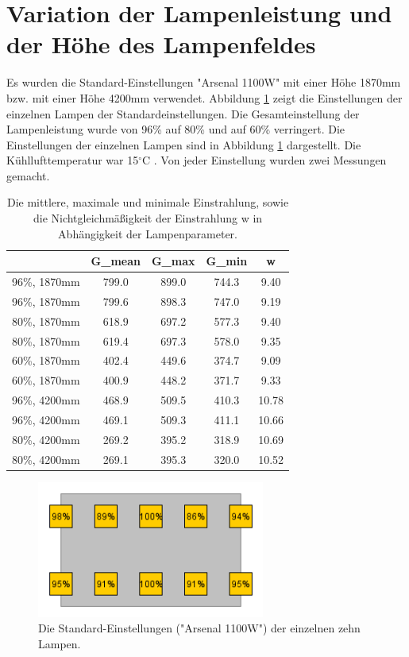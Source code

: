 \documentclass[a4paper,bibtotoc,oneside]{scrbook}
\begin{document}
\FloatBarrier

\section{Variation der Lampenleistung und der Höhe des Lampenfeldes}

Es wurden die Standard-Einstellungen "Arsenal 1100W" mit einer Höhe 1870mm bzw. mit einer Höhe 4200mm verwendet. Abbildung \ref{std} zeigt die Einstellungen der einzelnen Lampen der Standardeinstellungen. Die Gesamteinstellung der Lampenleistung wurde von 96\% auf 80\% und auf 60\% verringert. Die Einstellungen der einzelnen Lampen sind in Abbildung \ref{std} dargestellt. Die Kühllufttemperatur war 15$^{\circ}$C . Von jeder Einstellung wurden zwei Messungen gemacht.

\begin{table}[htbp]
\centering
\begin{tabular}{ | c | c | c | c | c | }\hline
{\bf} & {\bf G\_{mean}} & {\bf G\_{max}} & {\bf G\_{min}} & {\bf w}\\ \hline
\hline
96\%, 1870mm & 799.0 & 899.0 & 744.3 & 9.40\\ \hline
96\%, 1870mm & 799.6 & 898.3 & 747.0 & 9.19\\ \hline
80\%, 1870mm & 618.9 & 697.2 & 577.3 & 9.40\\ \hline
80\%, 1870mm & 619.4 & 697.3 & 578.0 & 9.35\\ \hline
60\%, 1870mm & 402.4 & 449.6 & 374.7 & 9.09\\ \hline
60\%, 1870mm & 400.9 & 448.2 & 371.7 & 9.33\\ \hline
96\%, 4200mm & 468.9 & 509.5 & 410.3 & 10.78\\ \hline
96\%, 4200mm & 469.1 & 509.3 & 411.1 & 10.66\\ \hline
80\%, 4200mm & 269.2 & 395.2 & 318.9 & 10.69\\ \hline
80\%, 4200mm & 269.1 & 395.3 & 320.0 & 10.52\\ \hline
\end{tabular}
\caption{Die mittlere, maximale und minimale Einstrahlung, sowie die Nichtgleichmäßigkeit der Einstrahlung w in Abhängigkeit der Lampenparameter.}\label{TabG}
\end{table}

\begin{figure}[htbp]
\centering
\includegraphics[width=75mm]{img/std.png}
\caption{Die Standard-Einstellungen ("Arsenal 1100W") der einzelnen zehn Lampen.}\label{std}
\end{figure}
\end{document}
